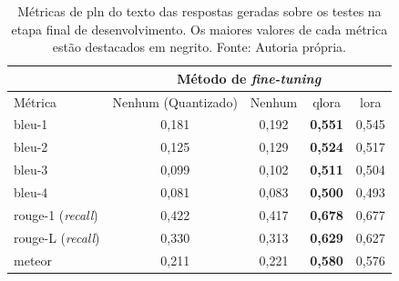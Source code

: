\begin{table}[ht]
    \centering
    \begin{tabular}{l|c|c|c|c}
        \hline
                                       & \multicolumn{4}{c}{Método de \textit{fine-tuning}}
        \\ \hline
        Métrica                        & Nenhum (Quantizado)
                                       & Nenhum                                             & \ac{qlora}
                                       & \ac{lora}
        \\ \hline
        \ac{bleu}-1                    & 0,181                                              & 0,192      &
        \textbf{0,551}
                                       & 0,545
        \\
        \ac{bleu}-2                    & 0,125                                              & 0,129      &
        \textbf{0,524}
                                       & 0,517
        \\
        \ac{bleu}-3                    & 0,099                                              & 0,102      &
        \textbf{0,511}
                                       & 0,504
        \\
        \ac{bleu}-4                    & 0,081                                              & 0,083      &
        \textbf{0,500}
                                       & 0,493
        \\
        \hline
        \ac{rouge}-1 (\textit{recall}) & 0,422                                              & 0,417      &
        \textbf{0,678}
                                       & 0,677
        \\
        \ac{rouge}-L (\textit{recall}) & 0,330                                              & 0,313      &
        \textbf{0,629}
                                       & 0,627
        \\
        \hline
        \ac{meteor}                    & 0,211                                              & 0,221      &
        \textbf{0,580}
                                       & 0,576
        \\
        \hline
    \end{tabular}
    \label{tab:overall_nlp_metrics}
    \caption{Métricas de \ac{pln} do texto das respostas geradas sobre os testes na etapa final de
    desenvolvimento. Os maiores valores de cada métrica estão destacados em negrito. Fonte: Autoria própria.}
\end{table}

